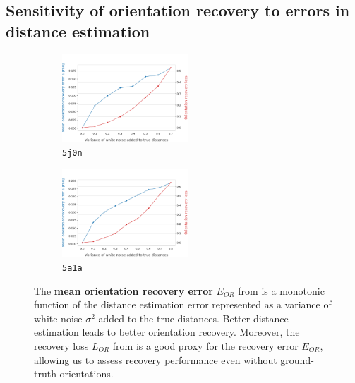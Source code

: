 \subsection{Sensitivity of orientation recovery to errors in distance estimation}\label{sec:results:orientation-recovery:sensitivity}


\begin{figure}
      \centering
    \begin{subfigure}[b]{0.48\linewidth}
        \includegraphics[height=3.3cm]{figures/5j0n_perfect_noisy_ar_aa}
        \caption{\texttt{5j0n}}
    \end{subfigure}
    \hfill
    \begin{subfigure}[b]{0.50\linewidth}
    \centering
        \includegraphics[height=3.3cm]{figures/5a1a_perfect_noisy_ar_aa}
        \caption{\texttt{5a1a}}
    \end{subfigure}
    \caption{
        The \textbf{mean orientation recovery error} $E_{OR}$ from  is a monotonic function of the distance estimation error represented as a variance of white noise $\sigma^2$ added to the true distances.
        Better distance estimation leads to better orientation recovery.
        Moreover, the recovery loss $L_{OR}$ from  is a good proxy for the recovery error $E_{OR}$, allowing us to assess recovery performance even without ground-truth orientations.
}
    \label{fig:perfect-with-noise-ar-aa}
\end{figure}

